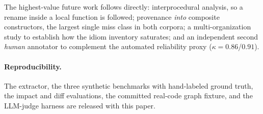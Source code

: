\documentclass[11pt]{article}
\begin{document}
The highest-value future work follows directly: interprocedural analysis, so a rename
inside a local function is followed; provenance \emph{into} composite constructors,
the largest single miss class in both corpora; a multi-organization study to
establish how the idiom inventory saturates; and an independent second \emph{human}
annotator to complement the automated reliability proxy ($\kappa=0.86$/$0.91$).

\paragraph{Reproducibility.} The extractor, the three synthetic benchmarks with
hand-labeled ground truth, the impact and diff evaluations, the committed real-code
graph fixture, and the LLM-judge harness are released with this paper.
\end{document}

